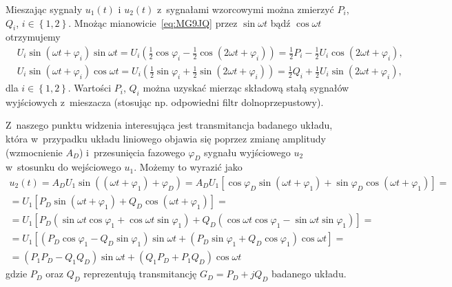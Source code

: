 \documentclass[paper=a4,DIV=12]{tfa}
\begin{document}
Mieszając sygnały $u_1(t)$ i $u_2(t)$ z~sygnałami wzorcowymi można zmierzyć
$P_i$, $Q_i$, $i \in \left\lbrace 1, 2 \right\rbrace$. Mnożąc
mianowicie~\eqref{eq:MG9JQ} przez $\sin{\omega t}$ bądź $\cos{\omega t}$
otrzymujemy
\begin{subequations}
  \begin{align}
    &  U_i \sin{(\omega t + \varphi_i)}\sin{\omega t}
      = U_i \left(
        \frac{1}{2}\cos{\varphi_i} - \frac{1}{2}\cos{(2 \omega t + \varphi_i)}
      \right)
      = \frac{1}{2} P_i -
        \frac{1}{2} U_i \cos{(2 \omega t + \varphi_i)},
    &
    \label{eq:S0V86}
    \\
    & U_i \sin{(\omega t + \varphi_i)}\cos{\omega t}
      = U_i \left(
        \frac{1}{2}\sin{\varphi_i} + \frac{1}{2}\sin{(2 \omega t + \varphi_i)}
      \right)
      = \frac{1}{2} Q_i +
        \frac{1}{2} U_i \sin{(2 \omega t + \varphi_i)},
    &
    \label{eq:IU4JA}
  \end{align}
  \label{eq:M1ICA}
\end{subequations}
dla $i \in \left\lbrace 1, 2 \right\rbrace$. Wartości $P_i$, $Q_i$ można
uzyskać mierząc składową stałą sygnałów wyjściowych z~mieszacza (stosując
np. odpowiedni filtr dolnoprzepustowy).

Z~naszego punktu widzenia interesująca jest transmitancja badanego układu,
która w~przypadku układu liniowego objawia się poprzez zmianę amplitudy
(wzmocnienie $A_D$) i~przesunięcia fazowego $\varphi_D$ sygnału wyjściowego
$u_2$ w~stosunku do wejściowego $u_1$. Możemy to wyrazić jako
\begin{multline}
  u_2(t) = A_D U_1 \sin{((\omega t + \varphi_1) + \varphi_D)} = A_D U_1 \left[
    \cos{\varphi_D} \sin{(\omega t + \varphi_1)
  + \sin{\varphi_D} \cos{(\omega t + \varphi_1)}}
  \right] = \\ = U_1 \left[
    P_D \sin{(\omega t + \varphi_1) + Q_D \cos{(\omega t + \varphi_1)}}
  \right] = \\ = U_1 \left[
    P_D \left(
      \sin{\omega t} \cos{\varphi_1}
    + \cos{\omega t} \sin{\varphi_1}
    \right) + Q_D \left(
      \cos{\omega t} \cos{\varphi_1}
    - \sin{\omega t} \sin{\varphi_1}
    \right)
  \right] = \\ = U_1 \left[
    \left(P_D \cos{\varphi_1} - Q_D \sin{\varphi_1}\right)\sin{\omega t}
  + \left(P_D \sin{\varphi_1} + Q_D \cos{\varphi_1}\right)\cos{\omega t}
  \right] = \\ =
    \left(P_1 P_D - Q_1 Q_D\right) \sin{\omega t}
  + \left(Q_1 P_D + P_1 Q_D\right) \cos{\omega t}
  \label{eq:HV0TF}
\end{multline}
gdzie $P_D$ oraz $Q_D$ reprezentują transmitancję $G_D = P_D + j Q_D$ badanego
układu.
\end{document}
